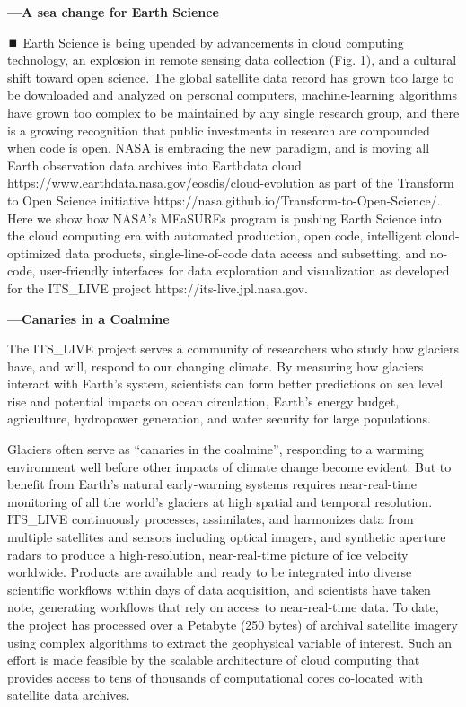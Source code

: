 \documentclass[
  super,
  preprint,
  3p,
  twocolumn]{elsarticle}
\begin{document}
\textbf{---A sea change for Earth Science}

⏹️ Earth Science is being upended by advancements in cloud computing
technology, an explosion in remote sensing data collection (Fig. 1), and
a cultural shift toward open science. The global satellite data record
has grown too large to be downloaded and analyzed on personal computers,
machine-learning algorithms have grown too complex to be maintained by
any single research group, and there is a growing recognition that
public investments in research are compounded when code is open. NASA is
embracing the new paradigm, and is moving all Earth observation data
archives into Earthdata cloud
https://www.earthdata.nasa.gov/eosdis/cloud-evolution as part of the
Transform to Open Science initiative
https://nasa.github.io/Transform-to-Open-Science/. Here we show how
NASA's MEaSUREs program is pushing Earth Science into the cloud
computing era with automated production, open code, intelligent
cloud-optimized data products, single-line-of-code data access and
subsetting, and no-code, user-friendly interfaces for data exploration
and visualization as developed for the ITS\_LIVE project
https://its-live.jpl.nasa.gov.

\textbf{---Canaries in a Coalmine}

The ITS\_LIVE project serves a community of researchers who study how
glaciers have, and will, respond to our changing climate. By measuring
how glaciers interact with Earth's system, scientists can form better
predictions on sea level rise and potential impacts on ocean
circulation, Earth's energy budget, agriculture, hydropower generation,
and water security for large populations.

Glaciers often serve as ``canaries in the coalmine'', responding to a
warming environment well before other impacts of climate change become
evident. But to benefit from Earth's natural early-warning systems
requires near-real-time monitoring of all the world's glaciers at high
spatial and temporal resolution. ITS\_LIVE continuously processes,
assimilates, and harmonizes data from multiple satellites and sensors
including optical imagers, and synthetic aperture radars to produce a
high-resolution, near-real-time picture of ice velocity worldwide.
Products are available and ready to be integrated into diverse
scientific workflows within days of data acquisition, and scientists
have taken note, generating workflows that rely on access to
near-real-time data. To date, the project has processed over a Petabyte
(250 bytes) of archival satellite imagery using complex algorithms to
extract the geophysical variable of interest. Such an effort is made
feasible by the scalable architecture of cloud computing that provides
access to tens of thousands of computational cores co-located with
satellite data archives.
\end{document}
